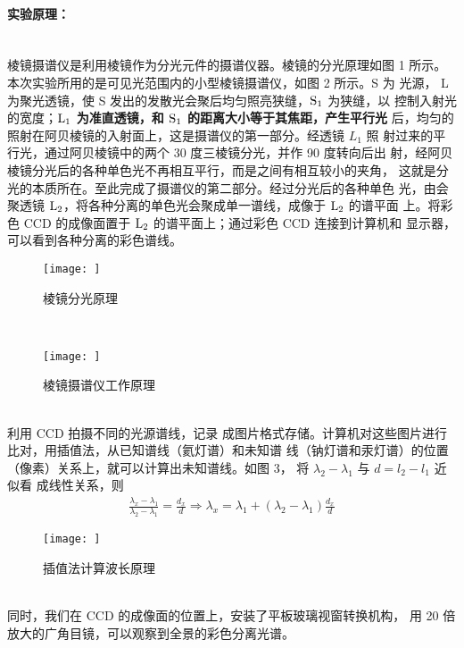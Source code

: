 \documentclass[UTF8]{ctexart}
\begin{document}
\paragraph*{实验原理：}~\\
\indent 棱镜摄谱仪是利用棱镜作为分光元件的摄谱仪器。棱镜的分光原理如图 1 所示。
本次实验所用的是可见光范围内的小型棱镜摄谱仪，如图 2 所示。S 为
光源， L 为聚光透镜，使 S 发出的发散光会聚后均匀照亮狭缝，$\rm{S_1}$ 为狭缝，以
控制入射光的宽度；\textbf{$\rm{L_1}$ 为准直透镜，和 $\rm{S_1}$ 的距离大小等于其焦距，产生平行光}
后，均匀的照射在阿贝棱镜的入射面上，这是摄谱仪的第一部分。经透镜 $L_1$ 照
射过来的平行光，通过阿贝棱镜中的两个 30 度三棱镜分光，并作 90 度转向后出
射，经阿贝棱镜分光后的各种单色光不再相互平行，而是之间有相互较小的夹角，
这就是分光的本质所在。至此完成了摄谱仪的第二部分。经过分光后的各种单色
光，由会聚透镜 $\rm{L_2}$，将各种分离的单色光会聚成单一谱线，成像于 $\rm{L_2}$ 的谱平面
上。将彩色 CCD 的成像面置于 $\rm{L_2}$ 的谱平面上；通过彩色 CCD 连接到计算机和
显示器，可以看到各种分离的彩色谱线。
\begin{figure}[H]
    \centering
    \texttt{[image: ]}
    \caption{棱镜分光原理}
 \end{figure}~\\
 \begin{figure}[H]
    \centering
    \texttt{[image: ]}
    \caption{棱镜摄谱仪工作原理}
 \end{figure}~\\
\indent 利用 CCD 拍摄不同的光源谱线，记录
成图片格式存储。计算机对这些图片进行比对，用插值法，从已知谱线（氦灯谱）和未知谱
线（钠灯谱和汞灯谱）的位置（像素）关系上，就可以计算出未知谱线。如图 3，
将 $\lambda_2-\lambda_1$ 与 $d=l_2-l_1$ 近似看
成线性关系，则
\begin{equation}
    \begin{split}
        \frac{\lambda_x-\lambda_1}{\lambda_2-\lambda_1}=\frac{d_x}{d}\Rightarrow \lambda_x=\lambda_1+(\lambda_2-\lambda_1)\frac{d_x}{d}     
    \end{split}
\end{equation}
 \begin{figure}[H]
    \centering
    \texttt{[image: ]}
    \caption{插值法计算波长原理}
 \end{figure}~\\
\indent 同时，我们在 CCD 的成像面的位置上，安装了平板玻璃视窗转换机构，
用 20 倍放大的广角目镜，可以观察到全景的彩色分离光谱。~\\
\end{document}
